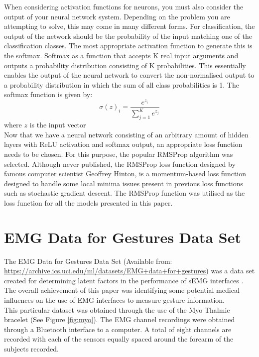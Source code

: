 \documentclass[11pt]{article}
\begin{document}
	\noindent
	When considering activation functions for neurons, you must also consider the output of your neural network system. Depending on the problem you are attempting to solve, this may come in many different forms. For classification, the output of the network should be the probability of the input matching one of the classification classes. The most appropriate activation function to generate this is the softmax. Softmax as a function that accepts K real input arguments and outputs a probability distribution consisting of K probabilities. This essentially enables the output of the neural network to convert the non-normalised output to a probability distribution in which the sum of all class probabilities is 1. The softmax function is given by:\\
	
	$$\sigma(z)_i= \frac{e^{z_i}}{\sum_{j=1}^{K}e^{z_j}}$$ where $z$ is the input vector\\
	
	\noindent
	Now that we have a neural network consisting of an arbitrary amount of hidden layers with ReLU activation and softmax output, an appropriate loss function needs to be chosen. For this purpose, the popular RMSProp algorithm was selected. Although never published, the RMSProp loss function designed by famous computer scientist Geoffrey Hinton, is a momentum-based loss function designed to handle some local minima issues present in previous loss functions such as stochastic gradient descent. The RMSProp function was utilised as the loss function for all the models presented in this paper. 
	
	
	\section{EMG Data for Gestures Data Set}
	The EMG Data for Gestures Data Set (Available from: \url{https://archive.ics.uci.edu/ml/datasets/EMG+data+for+gestures}) was a data set created for determining latent factors in the performance of sEMG interfaces \cite{Lobov2018}. The overall achievement of this paper was identifying some potential medical influences on the use of EMG interfaces to measure gesture information.\\
	
	\noindent
	This particular dataset was obtained through the use of the Myo Thalmic bracelet (See Figure \ref{fig:myo}). The EMG channel recordings were obtained through a Bluetooth interface to a computer. A total of eight channels are recorded with each of the sensors equally spaced around the forearm of the subjects recorded.\\
	
\end{document}
